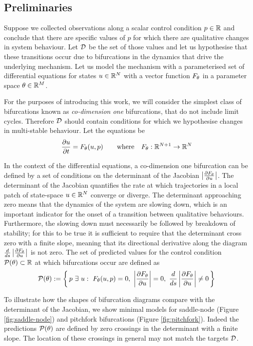 \subsection{Preliminaries}

Suppose we collected observations along a scalar control condition $p\in\mathbb{R}$ and conclude that there are specific values of $p$ for which there are qualitative changes in system behaviour. Let $\mathcal{D}$ be the set of those values and let us hypothesise that these transitions occur due to bifurcations in the dynamics that drive the underlying mechanism. Let us model the mechanism with a parameterised set of differential equations for states $u\in\mathbb{R}^N$ with a vector function $F_{\theta}$ in a parameter space $\theta\in\mathbb{R}^M$.

For the purposes of introducing this work, we will consider the simplest class of bifurcations known as \textit{co-dimension one} bifurcations, that do not include limit cycles. Therefore $\mathcal{D}$ should contain conditions for which we hypothesise changes in multi-stable behaviour. Let the equations be
\begin{align}
	\frac{\partial u}{\partial t}=F_{\theta}(u,p)
	\qquad\mathrm{where}\quad
	F_{\theta} : \mathbb{R}^{N+1}\rightarrow\mathbb{R}^N
	\label{eq:model}
\end{align}

In the context of the differential equations, a co-dimension one bifurcation can be defined by a set of conditions on the determinant of the Jacobian $\left| \frac{\partial F_{\theta}}{\partial u} \right|$. The determinant of the Jacobian quantifies the rate at which trajectories in a local patch of state-space $u\in\mathbb{R}^N$ converge or diverge. The determinant approaching zero means that the dynamics of the system are slowing down, which is an important indicator for the onset of a transition between qualitative behaviours. Furthermore, the slowing down must necessarily be followed by breakdown of stability; for this to be true it is sufficient to require that the determinant cross zero with a finite slope, meaning that its directional derivative along the diagram $\frac{d}{ds}\left| \frac{\partial F_{\theta}}{\partial u} \right|$ is not zero. The set of predicted values for the control condition $\mathcal{P}(\theta)\subset\mathbb{R}$ at which bifurcations occur are defined as
\begin{align}
	\mathcal{P}(\theta):=\left\{\,
	p\,\,\exists\,\,u:\,\,F_{\theta}(u,p)=0,\,\,\left| \frac{\partial F_{\theta}}{\partial u} \right|=0,
	\,\, \frac{d}{ds}\left| \frac{\partial F_{\theta}}{\partial u} \right|\neq0
	\,\right\}
	\label{eq:predictions}
\end{align}

To illustrate how the shapes of bifurcation diagrams compare with the determinant of the Jacobian, we show minimal models for saddle-node (Figure \ref{fig:saddle-node}) and pitchfork bifurcations (Figure \ref{fig:pitchfork}). Indeed the predictions $\mathcal{P}(\theta)$ are defined by zero crossings in the determinant with a finite slope. The location of these crossings in general may not match the targets $\mathcal{D}$.

